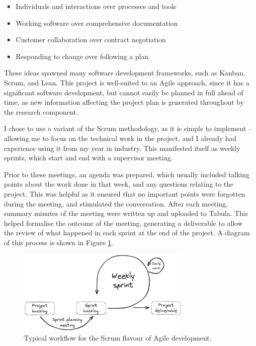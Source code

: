 \begin{itemize}
    \item Individuals and interactions over processes and tools
    \item Working software over comprehensive documentation
    \item Customer collaboration over contract negotiation
    \item Responding to change over following a plan
\end{itemize}

These ideas spawned many software development frameworks, such as Kanban, Scrum, and Lean. This project is well-suited to an Agile approach, since it has a significant software development, but cannot easily be planned in full ahead of time, as new information affecting the project plan is generated throughout by the research component.

I chose to use a variant of the Scrum methodology, as it is simple to implement -- allowing me to focus on the technical work in the project, and I already had experience using it from my year in industry. This manifested itself as weekly sprints, which start and end with a supervisor meeting.

Prior to these meetings, an agenda was prepared, which usually included talking points about the work done in that week, and any questions relating to the project. This was helpful as it ensured that no important points were forgotten during the meeting, and stimulated the conversation. After each meeting, summary minutes of the meeting were written up and uploaded to Tabula. This helped formalise the outcome of the meeting, generating a deliverable to allow the review of what happened in each sprint at the end of the project. A diagram of this process is shown in Figure \ref{fig:excalidraw_agile}.

\begin{figure}[H]
    \centering
    \includegraphics[width=0.75\textwidth]{images/6_project_management/excalidraw_agile.png}
    \caption{Typical workflow for the Scrum flavour of Agile development.}
    \label{fig:excalidraw_agile}
\end{figure}

